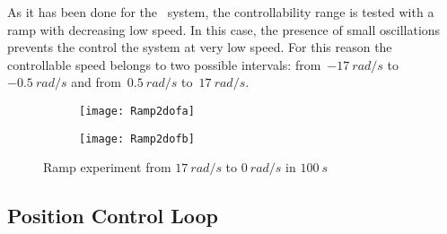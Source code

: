 As it has been done for the \onedof\ system, the controllability range is tested with a ramp with decreasing low speed. In this case, the presence of small oscillations prevents the control the system at very low speed. For this reason the controllable speed belongs to two possible intervals: from~$-17\ rad/s$ to~$-0.5\ rad/s$ and from~$0.5\ rad/s$ to~$17\ rad/s$.
\begin{figure*}[h]
	\centering
	\begin{subfigure}{0.45\columnwidth}
		\texttt{[image: Ramp2dofa]}
	\end{subfigure}
	\begin{subfigure}{0.45\columnwidth}
		\texttt{[image: Ramp2dofb]}
	\end{subfigure}

	\caption{Ramp experiment from $17\ rad/s$ to $0\ rad/s$ in $100\ s$}
	\label{fig:Ramp2dof}
\end{figure*}

\newpage
\subsection{Position Control Loop}

